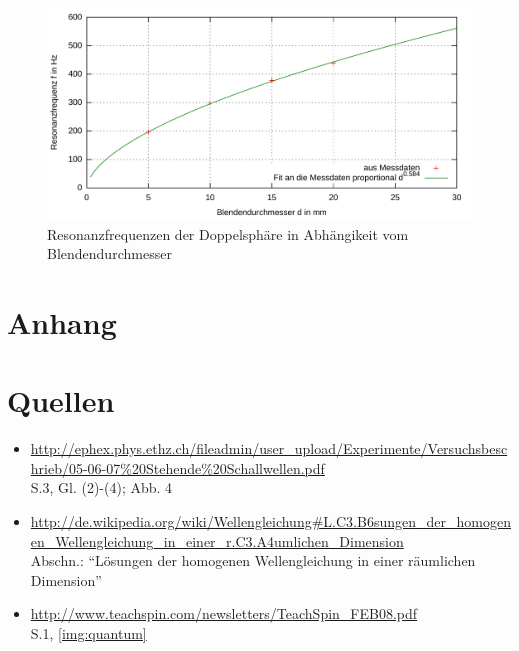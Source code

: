 \documentclass[numbers=noenddot,12pt,a4paper]{scrartcl}
\begin{document}
\begin{figure}[H]
	\centering
	\includegraphics[width=\textwidth]{messwerte/resonanzendoppelsphre.pdf}
	\caption{Resonanzfrequenzen der Doppelsphäre in Abhängikeit vom Blendendurchmesser}\label{img:reskopp}
\end{figure}

\fancyfoot[L]{\textit{}}
\newpage
\fancyfoot[L]{}

\section{Anhang}
\section{Quellen}
\begin{itemize}
	\item{\url{http://ephex.phys.ethz.ch/fileadmin/user_upload/Experimente/Versuchsbeschrieb/05-06-07%20Stehende%20Schallwellen.pdf}\\ S.3, Gl. (2)-(4); Abb. 4}
	\item{\url{http://de.wikipedia.org/wiki/Wellengleichung#L.C3.B6sungen_der_homogenen_Wellengleichung_in_einer_r.C3.A4umlichen_Dimension}\\ Abschn.: "`Lösungen der homogenen Wellengleichung in einer räumlichen Dimension"'}
	\item{\url{http://www.teachspin.com/newsletters/TeachSpin_FEB08.pdf}\\ S.1, \ref{img:quantum}}
\end{itemize}
\end{document}
